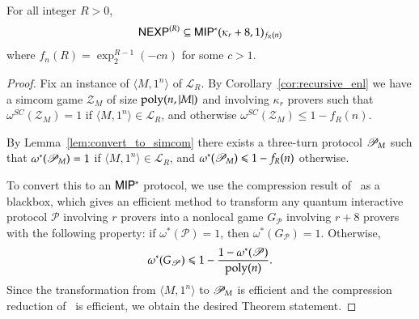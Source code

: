 \begin{theorem}[Main]
	For all integer $R > 0$, 
	\[
		{\sf NEXP}^{(R)} \subseteq {\sf MIP^*}(\kappa_r+8,1)_{f_R(n)}
	\]
	 where $f_n(R) = \exp^{R-1}_2(-cn)$ for some $c > 1$.
\end{theorem}
\begin{proof}
	Fix an instance of $\langle M,1^n \rangle$ of $\mathcal{L}_R$. By Corollary~\ref{cor:recursive_enl} we have a simcom game $\mathscr{Z}_M$  of size $\operatorname{poly}(n,|M|)$ and involving $\kappa_r$ provers such that $\omega^{SC}(\mathscr{Z}_M) = 1$ if $\langle M,1^n \rangle \in \mathcal{L}_R$, and otherwise $\omega^{SC}(\mathscr{Z}_M) \leq 1 - f_R(n)$. 
	
	By Lemma~\ref{lem:convert_to_simcom} there exists a three-turn protocol $\mathscr{P}_M$ such that $\omega^*(\mathscr{P}_M) = 1$ if $\langle M,1^n \rangle \in \mathcal{L}_R$, and $\omega^*(\mathscr{P}_M) \leqslant 1 - f_R(n)$ otherwise.
	
	To convert this to an ${\sf MIP^*}$ protocol, we use the compression result of~\cite{ji2016compression} as a blackbox, which gives an efficient method to transform any quantum interactive protocol $\mathscr{P}$ involving $r$ provers into a nonlocal game $G_{\mathscr{P}}$ involving $r + 8$ provers with the following property: if $\omega^*(\mathscr{P}) = 1$, then $\omega^*(G_{\mathscr{P}}) = 1$. Otherwise, 
	\[
		\omega^*(G_{\mathscr{P}}) \leqslant 1 - \frac{1 - \omega^*(\mathscr{P})}{\operatorname{poly}(n)}. 
	\]
	Since the transformation from $\langle M,1^n \rangle$ to $\mathscr{P}_M$ is efficient and the compression reduction of~\cite{ji2016compression} is efficient, we obtain the desired Theorem statement.
\end{proof}

